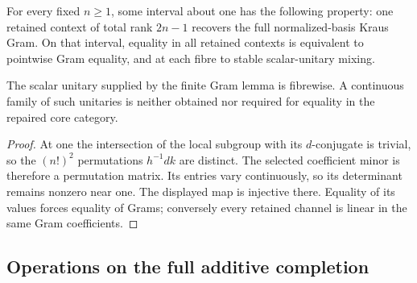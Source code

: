\begin{theorem}
{\normalfont\statusProved}\quad
For every fixed $n\geq1$, some interval about one has the following property:
one retained context of total rank $2n-1$ recovers the full normalized-basis
Kraus Gram.  On that interval, equality in all retained contexts is
equivalent to pointwise Gram equality, and at each fibre to stable
scalar-unitary mixing.
\end{theorem}
\begin{scope}
The scalar unitary supplied by the finite Gram lemma is fibrewise.  A
continuous family of such unitaries is neither obtained nor required for
equality in the repaired core category.
\end{scope}
\begin{proof}
At one the intersection of the local subgroup with its $d$-conjugate is
trivial, so the $(n!)^2$ permutations $h^{-1}dk$ are distinct.  The selected
coefficient minor is therefore a permutation matrix.  Its entries vary
continuously, so its determinant remains nonzero near one.  The displayed
map is injective there.  Equality of its values forces equality of Grams;
conversely every retained channel is linear in the same Gram coefficients.
\end{proof}

\subsection{Operations on the full additive completion}

